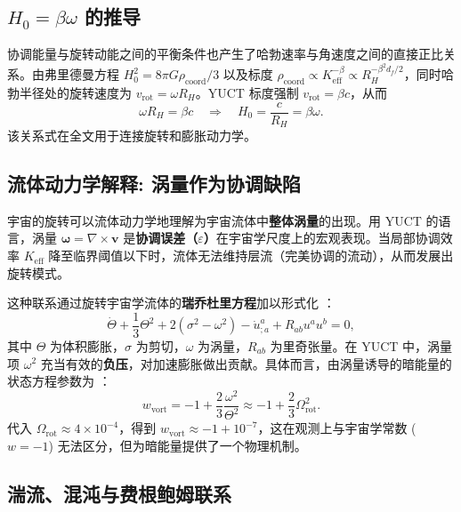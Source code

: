 \documentclass[11pt,a4paper]{article}
\begin{document}
	\subsection{\(H_0 = \beta \omega\) 的推导}
	
	协调能量与旋转动能之间的平衡条件也产生了哈勃速率与角速度之间的直接正比关系。由弗里德曼方程 \(H_0^2 = 8\pi G \rho_{\mathrm{coord}} / 3\) 以及标度 \(\rho_{\mathrm{coord}} \propto K_{\mathrm{eff}}^{-\beta} \propto R_H^{-\beta^2 d_f /2}\)，同时哈勃半径处的旋转速度为 \(v_{\mathrm{rot}} = \omega R_H\)。YUCT 标度强制 \(v_{\mathrm{rot}} = \beta c\)，从而
	\begin{equation}
		\omega R_H = \beta c \quad \Rightarrow \quad H_0 = \frac{c}{R_H} = \beta \omega.
		\label{eq:H0-beta-omega}
	\end{equation}
	该关系式在全文用于连接旋转和膨胀动力学。
	
	\subsection{流体动力学解释: 涡量作为协调缺陷}
	
	宇宙的旋转可以流体动力学地理解为宇宙流体中\textbf{整体涡量}的出现。用 YUCT 的语言，涡量 \(\boldsymbol{\omega} = \nabla \times \mathbf{v}\) 是\textbf{协调误差（\(\varepsilon\)）}在宇宙学尺度上的宏观表现。当局部协调效率 \(K_{\mathrm{eff}}\) 降至临界阈值以下时，流体无法维持层流（完美协调的流动），从而发展出旋转模式。
	
	这种联系通过旋转宇宙学流体的\textbf{瑞乔杜里方程}加以形式化 \cite{Ellis1971}：
	\begin{equation}
		\dot{\Theta} + \frac{1}{3}\Theta^2 + 2(\sigma^2 - \omega^2) - \dot{u}^a_{;a} + R_{ab}u^a u^b = 0,
	\end{equation}
	其中 \(\Theta\) 为体积膨胀，\(\sigma\) 为剪切，\(\omega\) 为涡量，\(R_{ab}\) 为里奇张量。在 YUCT 中，涡量项 \(\omega^2\) 充当有效的\textbf{负压}，对加速膨胀做出贡献。具体而言，由涡量诱导的暗能量的状态方程参数为 \cite{Tsagas2011}：
	\begin{equation}
		w_{\mathrm{vort}} = -1 + \frac{2}{3}\frac{\omega^2}{\Theta^2} \approx -1 + \frac{2}{3}\Omega_{\mathrm{rot}}^2.
	\end{equation}
	代入 \(\Omega_{\mathrm{rot}} \approx 4 \times 10^{-4}\)，得到 \(w_{\mathrm{vort}} \approx -1 + 10^{-7}\)，这在观测上与宇宙学常数 (\(w = -1\)) 无法区分，但为暗能量提供了一个物理机制。
	
	\subsection{湍流、混沌与费根鲍姆联系}
	
\end{document}

